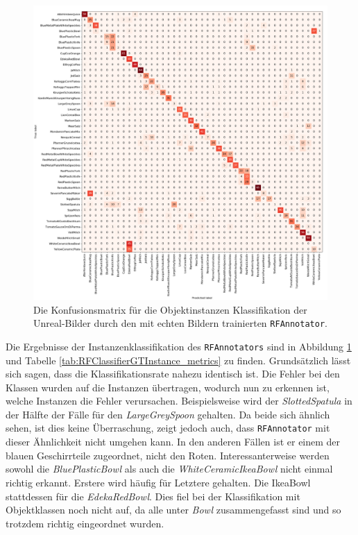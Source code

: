 \begin{figure}
\centering
	\includegraphics[scale=.292]{img/chapter6/RFClassifierGTInstance.png}
\caption[Konfusionsmatrix der Klassifizierung der Objektinstanzen durch den RFAnnotator]{Die Konfusionsmatrix für die Objektinstanzen Klassifikation der Unreal-Bilder durch den mit echten Bildern trainierten \texttt{RFAnnotator}.}
\label{fig:RFClassifierGTInstance_confMatrix}
\end{figure}

Die Ergebnisse der Instanzenklassifikation des \texttt{RFAnnotators} sind in Abbildung \ref{fig:RFClassifierGTInstance_confMatrix} und Tabelle \ref{tab:RFClassifierGTInstance_metrics} zu finden. Grundsätzlich lässt sich sagen, dass die Klassifikationsrate nahezu identisch ist. Die Fehler bei den Klassen wurden auf die Instanzen übertragen, wodurch nun zu erkennen ist, welche Instanzen die Fehler verursachen. Beispielsweise wird der \textit{SlottedSpatula} in der Hälfte der Fälle für den \textit{LargeGreySpoon} gehalten. Da beide sich ähnlich sehen, ist dies keine Überraschung, zeigt jedoch auch, dass \texttt{RFAnnotator} mit dieser Ähnlichkeit nicht umgehen kann. In den anderen Fällen ist er einem der blauen Geschirrteile zugeordnet, nicht den Roten. \newline
Interessanterweise werden sowohl die \textit{BluePlasticBowl} als auch die \textit{WhiteCeramicIkeaBowl} nicht einmal richtig erkannt. Erstere wird häufig für Letztere gehalten. Die IkeaBowl stattdessen für die \textit{EdekaRedBowl}. Dies fiel bei der Klassifikation mit Objektklassen noch nicht auf, da alle unter \textit{Bowl} zusammengefasst sind und so trotzdem richtig eingeordnet wurden.   

